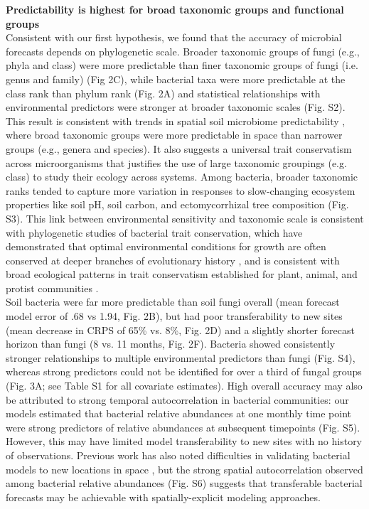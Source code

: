 \documentclass[11pt]{article}
\begin{document}
\textbf{Predictability is highest for broad taxonomic groups and functional groups} \\
Consistent with our first hypothesis, we found that the accuracy of microbial forecasts depends on phylogenetic scale. Broader taxonomic groups of fungi (e.g., phyla and class) were more predictable than finer taxonomic groups of fungi (i.e. genus and family) (Fig 2C), while bacterial taxa were more predictable at the class rank than phylum rank (Fig. 2A) and statistical relationships with environmental predictors were stronger at broader taxonomic scales (Fig. S2). This result is consistent with trends in spatial soil microbiome predictability \cite{averill_soil_2021}, where broad taxonomic groups were more predictable in space than narrower groups (e.g., genera and species). It also suggests a universal trait conservatism across microorganisms that justifies the use of large taxonomic groupings (e.g. class) to study their ecology across systems. Among bacteria, broader taxonomic ranks tended to capture more variation in responses to slow-changing ecosystem properties like soil pH, soil carbon, and ectomycorrhizal tree composition (Fig. S3). This link between environmental sensitivity and taxonomic scale is consistent with phylogenetic studies of bacterial trait conservation, which have demonstrated that optimal environmental conditions for growth are often conserved at deeper branches of evolutionary history \cite{martiny_phylogenetic_2013,martiny_microbiomes_2015}, and is consistent with broad ecological patterns in trait conservatism established for plant, animal, and protist communities \cite{cavender-bares_phylogenetic_2006,cavenderbares_merging_2009,shade_macroecology_2018}. \\
Soil bacteria were far more predictable than soil fungi overall (mean forecast model error of .68 vs 1.94, Fig. 2B), but had poor transferability to new sites (mean decrease in CRPS of 65\% vs. 8\%, Fig. 2D) and a slightly shorter forecast horizon than fungi (8 vs. 11 months, Fig. 2F). Bacteria showed consistently stronger relationships to multiple environmental predictors than fungi (Fig. S4), whereas strong predictors could not be identified for over a third of fungal groups (Fig. 3A; see Table S1 for all covariate estimates). High overall accuracy may also be attributed to strong temporal autocorrelation in bacterial communities: our models estimated that bacterial relative abundances at one monthly time point were strong predictors of relative abundances at subsequent timepoints (Fig. S5). However, this may have limited model transferability to new sites with no history of observations. Previous work has also noted difficulties in validating bacterial models to new locations in space \cite{averill_soil_2021}, but the strong spatial autocorrelation observed among bacterial relative abundances (Fig. S6) suggests that transferable bacterial forecasts may be achievable with spatially-explicit modeling approaches. \\
\end{document}
